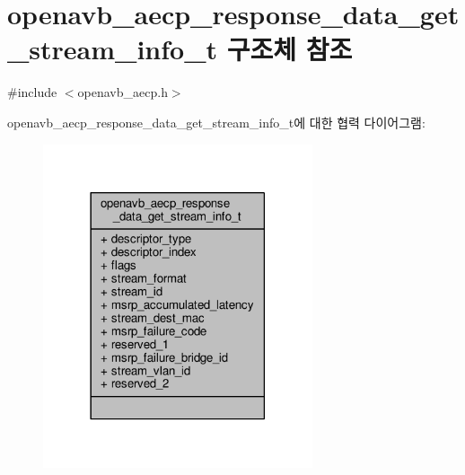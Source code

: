 \hypertarget{structopenavb__aecp__response__data__get__stream__info__t}{}\section{openavb\+\_\+aecp\+\_\+response\+\_\+data\+\_\+get\+\_\+stream\+\_\+info\+\_\+t 구조체 참조}
\label{structopenavb__aecp__response__data__get__stream__info__t}


{\ttfamily \#include $<$openavb\+\_\+aecp.\+h$>$}



openavb\+\_\+aecp\+\_\+response\+\_\+data\+\_\+get\+\_\+stream\+\_\+info\+\_\+t에 대한 협력 다이어그램\+:
\nopagebreak
\begin{figure}[H]
\begin{center}
\leavevmode
\includegraphics[width=225pt]{structopenavb__aecp__response__data__get__stream__info__t__coll__graph}
\end{center}
\end{figure}
